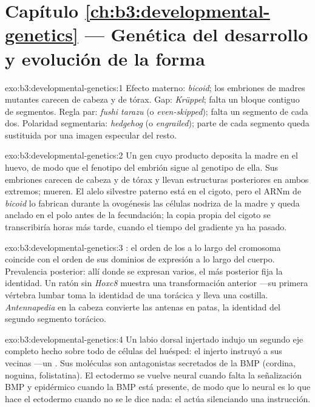\section*{Capítulo \ref{ch:b3:developmental-genetics} --- Genética del desarrollo y evolución de la forma}

\begin{solution}{exo:b3:developmental-genetics:1}
Efecto materno: \emph{bicoid}; los embriones de madres mutantes carecen
de cabeza y de tórax. Gap: \emph{Krüppel}; falta un bloque contiguo de
segmentos. Regla par: \emph{fushi tarazu} (o \emph{even-skipped});
falta un segmento de cada dos. Polaridad segmentaria: \emph{hedgehog}
(o \emph{engrailed}); parte de cada segmento queda sustituida por una
imagen especular del resto.
\end{solution}

\begin{solution}{exo:b3:developmental-genetics:2}
Un gen cuyo producto deposita la madre en el huevo, de modo que el
fenotipo del embrión sigue al genotipo de ella. Sus embriones carecen
de cabeza y de tórax y llevan estructuras posteriores en ambos
extremos; mueren. El alelo silvestre paterno está en el cigoto, pero el
ARNm de \emph{bicoid} lo fabrican durante la ovogénesis las células
nodriza de la madre y queda anclado en el polo antes de la fecundación;
la copia propia del cigoto se transcribiría horas más tarde, cuando el
tiempo del gradiente ya ha pasado.
\end{solution}

\begin{solution}{exo:b3:developmental-genetics:3}
: el orden de los  a lo largo del cromosoma
coincide con el orden de sus dominios de expresión a lo largo del
cuerpo. Prevalencia posterior: allí donde se expresan varios, el más
posterior fija la identidad. Un ratón sin \emph{Hoxc8} muestra una
transformación anterior ---su primera vértebra lumbar toma la identidad
de una torácica y lleva una costilla. \emph{Antennapedia} en la cabeza
convierte las antenas en patas, la identidad del segundo segmento
torácico.
\end{solution}

\begin{solution}{exo:b3:developmental-genetics:4}
Un labio dorsal injertado indujo un segundo eje completo hecho sobre
todo de células del huésped: el injerto instruyó a sus vecinas ---un
. Sus moléculas son antagonistas secretados de la BMP
(cordina, noguina, folistatina). El ectodermo se vuelve neural cuando
falta la señalización BMP y epidérmico cuando la BMP está presente, de
modo que lo neural es lo que hace el ectodermo cuando no se le dice
nada: el  actúa silenciando una instrucción.
\end{solution}

